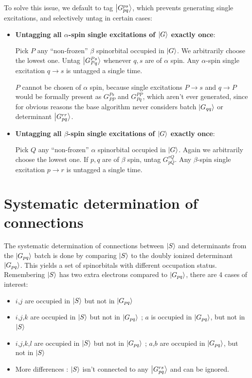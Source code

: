 \documentclass[./thesis.tex]{subfiles}
\begin{document}
To solve this issue, we default to tag $\ket {G_{pq}^{ps}}$, which prevents generating single excitations, and selectively untag in certain cases:


\begin{itemize}
\item
\textbf{Untagging all $\alpha$-spin single excitations of $\ket G$ exactly once}:

Pick $P$ any ``non-frozen'' $\beta$ spinorbital occupied in $\ket G$. We arbitrarily choose the lowest one. Untag $\ket {G_{Pq}^{Ps}}$ whenever $q,s$ are of $\alpha$ spin. Any $\alpha$-spin single excitation $q \rightarrow  s$ is untagged a single time.

$P$ cannot be chosen of $\alpha$ spin, because single excitations $P \rightarrow  s$ and $q \rightarrow  P$ would be formally present as $G_{PP}^{Ps}$ and $G_{Pq}^{PP}$, which aren't ever generated, since for obvious reasons the base algorithm never considers batch $\ket {G_{qq}}$ or determinant $\ket {G_{pq}^{rr}}$.
\item
\textbf{Untagging all $\beta$-spin single excitations of $\ket G$ exactly once}:

Pick $Q$ any ``non-frozen'' $\alpha$ spinorbital occupied in $\ket G$. Again we arbitrarily choose the lowest one. If $p,q$ are of $\beta$ spin, untag $G_{pQ}^{rQ}$. Any $\beta$-spin single excitation $p \rightarrow  r$ is untagged a single time.
\end{itemize}



\section{Systematic determination of connections}

The systematic determination of connections between $\ket S$ and determinants from the $\ket {G_{pq}}$ batch is done by comparing $\ket S$ to the doubly ionized determinant $\ket {G_{pq}}$. This yields a set of spinorbitals with different occupation status. Remembering $\ket S$ has two extra electrons compared to $\ket {G_{pq}}$, there are 4 cases of interest:
\begin{itemize}

\item
$i$,$j$ are occupied in $\ket S$ but not in $\ket {G_{pq}}$
\item
$i$,$j$,$k$ are occupied in $\ket S$ but not in $\ket {G_{pq}}$ ; $a$ is occupied in $\ket {G_{pq}}$, but not in $\ket S$
\item
$i$,$j$,$k$,$l$ are occupied in $\ket S$ but not in $\ket {G_{pq}}$ ; $a$,$b$ are occupied in $\ket {G_{pq}}$, but not in $\ket S$
\item
More differences : $\ket S$ isn't connected to any $\ket {G_{pq}^{rs}}$ and can be ignored. 

\end{itemize}
\end{document}
